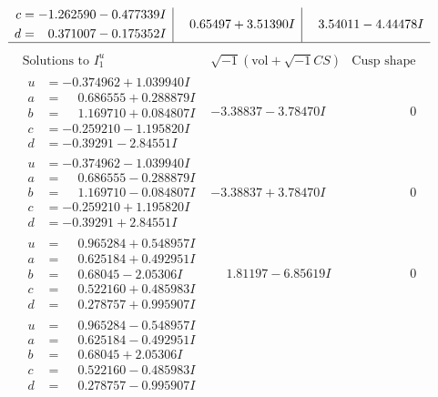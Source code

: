 \documentclass[1p]{elsarticle_modified}
\theoremstyle{definition}
\newcommand{\I}{\sqrt{-1}}
\begin{document}
$$\begin{array}{c|c|c}
\begin{aligned}
c &= -1.262590 - 0.477339 I \\
d &= \phantom{-}0.371007 - 0.175352 I\end{aligned}
 & \phantom{-}0.65497 + 3.51390 I & \phantom{-}3.54011 - 4.44478 I\\
 \hline 
 \end{array}$$\newpage$$\begin{array}{c|c|c}  
\text{Solutions to }I^u_{1}& \I (\text{vol} + \sqrt{-1}CS) & \text{Cusp shape}\\
 \hline 
\begin{aligned}
u &= -0.374962 + 1.039940 I \\
a &= \phantom{-}0.686555 + 0.288879 I \\
b &= \phantom{-}1.169710 + 0.084807 I \\
c &= -0.259210 - 1.195820 I \\
d &= -0.39291 - 2.84551 I\end{aligned}
 & -3.38837 - 3.78470 I & \phantom{-0.000000 } 0 \\ \hline\begin{aligned}
u &= -0.374962 - 1.039940 I \\
a &= \phantom{-}0.686555 - 0.288879 I \\
b &= \phantom{-}1.169710 - 0.084807 I \\
c &= -0.259210 + 1.195820 I \\
d &= -0.39291 + 2.84551 I\end{aligned}
 & -3.38837 + 3.78470 I & \phantom{-0.000000 } 0 \\ \hline\begin{aligned}
u &= \phantom{-}0.965284 + 0.548957 I \\
a &= \phantom{-}0.625184 + 0.492951 I \\
b &= \phantom{-}0.68045 - 2.05306 I \\
c &= \phantom{-}0.522160 + 0.485983 I \\
d &= \phantom{-}0.278757 + 0.995907 I\end{aligned}
 & \phantom{-}1.81197 - 6.85619 I & \phantom{-0.000000 } 0 \\ \hline\begin{aligned}
u &= \phantom{-}0.965284 - 0.548957 I \\
a &= \phantom{-}0.625184 - 0.492951 I \\
b &= \phantom{-}0.68045 + 2.05306 I \\
c &= \phantom{-}0.522160 - 0.485983 I \\
d &= \phantom{-}0.278757 - 0.995907 I\end{aligned}

\end{array}$$
\end{document}
